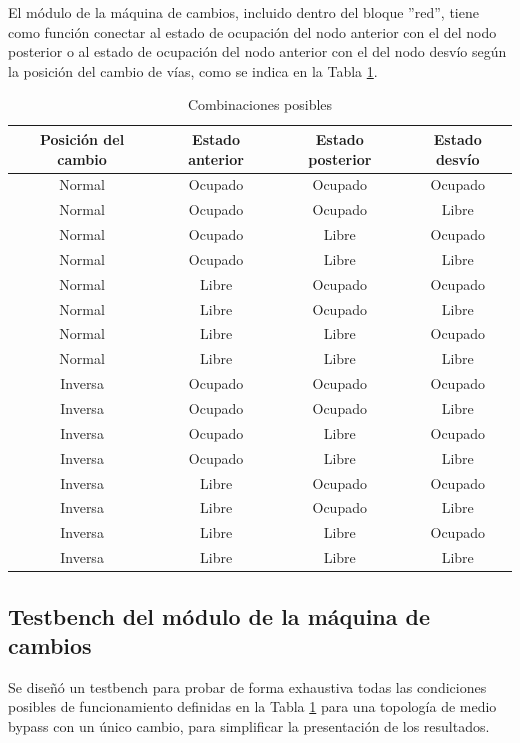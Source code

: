 	El módulo de la máquina de cambios, incluido dentro del bloque ''red'', tiene como función conectar al estado de ocupación del nodo anterior con el del nodo posterior o al estado de ocupación del nodo anterior con el del nodo desvío según la posición del cambio de vías, como se indica en la Tabla \ref{tabla_cambios}.
	
			\begin{table}[!hbt]
			\renewcommand{\arraystretch}{1.3}
			\caption{Combinaciones posibles}
			\label{tabla_cambios}
			\centering
			\begin{tabular}{ c  c  c  c}
			\hline
			Posición del cambio & Estado anterior & Estado posterior & Estado desvío \\	
			\hline
			Normal & Ocupado & Ocupado  & Ocupado \\
			Normal & Ocupado & Ocupado  & Libre \\
			Normal & Ocupado & Libre  & Ocupado \\
			Normal & Ocupado & Libre  & Libre \\
			Normal & Libre & Ocupado  & Ocupado \\
			Normal & Libre & Ocupado  & Libre \\
			Normal & Libre & Libre  & Ocupado \\
			Normal & Libre & Libre  & Libre \\
			Inversa & Ocupado & Ocupado  & Ocupado \\
			Inversa & Ocupado & Ocupado  & Libre \\
			Inversa & Ocupado & Libre  & Ocupado \\
			Inversa & Ocupado & Libre  & Libre \\
			Inversa & Libre & Ocupado  & Ocupado \\
			Inversa & Libre & Ocupado  & Libre \\
			Inversa & Libre & Libre  & Ocupado \\
			Inversa & Libre & Libre  & Libre \\	
			\end{tabular}
			\end{table}	
	
	\subsection{Testbench del módulo de la máquina de cambios}
		
		Se diseñó un testbench para probar de forma exhaustiva todas las condiciones posibles de funcionamiento definidas en la Tabla \ref{tabla_cambios} para una topología de medio bypass con un único cambio, para simplificar la presentación de los resultados.
						
